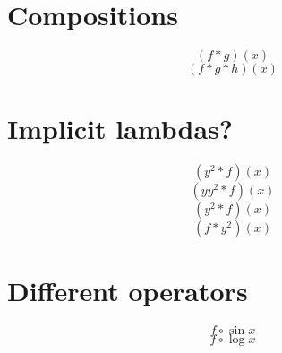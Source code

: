 \documentclass{article}
\begin{document}
\section{Compositions}
\[ (f*g)(x) \]
\[ (f*g*h)(x) \]
\section{Implicit lambdas?}
\[ (y^2 * f)(x) \]
\[ (y y^2 * f)(x) \]
\[ (y^2 * f)(x) \]
\[ (f * y^2)(x) \]

\section{Different operators}
\[ f \circ \sin x \]
\[ f \circ \log x \]
\end{document}
